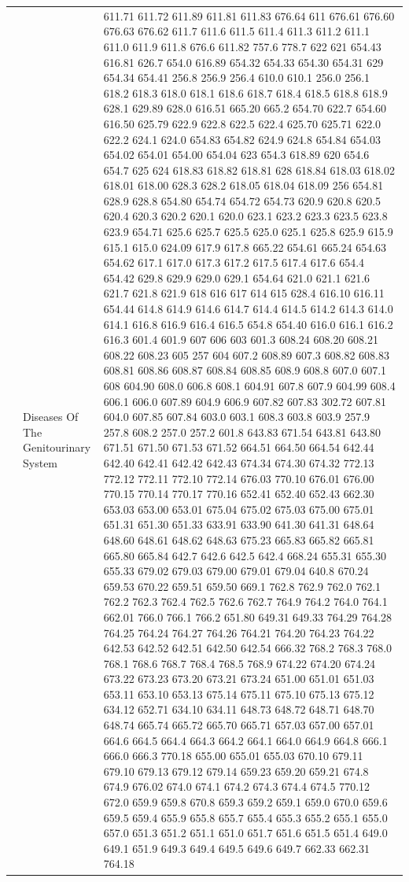 \documentclass[3p,super,numbers,sort&compress,preprint,10pt]{elsarticle}
\begin{document}
\begin{longtable}{|L{.1in}|L{.6in}||L{5.65in}|}
   & Diseases Of The Genitourinary System   &  611.71 611.72 611.89 611.81 611.83 676.64 611 676.61 676.60 676.63 676.62 611.7 611.6 611.5 611.4 611.3 611.2 611.1 611.0 611.9 611.8 676.6 611.82 757.6 778.7 622 621 654.43 616.81 626.7 654.0 616.89 654.32 654.33 654.30 654.31 629 654.34 654.41 256.8 256.9 256.4 610.0 610.1 256.0 256.1 618.2 618.3 618.0 618.1 618.6 618.7 618.4 618.5 618.8 618.9 628.1 629.89 628.0 616.51 665.20 665.2 654.70 622.7 654.60 616.50 625.79 622.9 622.8 622.5 622.4 625.70 625.71 622.0 622.2 624.1 624.0 654.83 654.82 624.9 624.8 654.84 654.03 654.02 654.01 654.00 654.04 623 654.3 618.89 620 654.6 654.7 625 624 618.83 618.82 618.81 628 618.84 618.03 618.02 618.01 618.00 628.3 628.2 618.05 618.04 618.09 256 654.81 628.9 628.8 654.80 654.74 654.72 654.73 620.9 620.8 620.5 620.4 620.3 620.2 620.1 620.0 623.1 623.2 623.3 623.5 623.8 623.9 654.71 625.6 625.7 625.5 625.0 625.1 625.8 625.9 615.9 615.1 615.0 624.09 617.9 617.8 665.22 654.61 665.24 654.63 654.62 617.1 617.0 617.3 617.2 617.5 617.4 617.6 654.4 654.42 629.8 629.9 629.0 629.1 654.64 621.0 621.1 621.6 621.7 621.8 621.9 618 616 617 614 615 628.4 616.10 616.11 654.44 614.8 614.9 614.6 614.7 614.4 614.5 614.2 614.3 614.0 614.1 616.8 616.9 616.4 616.5 654.8 654.40 616.0 616.1 616.2 616.3 601.4 601.9 607 606 603 601.3 608.24 608.20 608.21 608.22 608.23 605 257 604 607.2 608.89 607.3 608.82 608.83 608.81 608.86 608.87 608.84 608.85 608.9 608.8 607.0 607.1 608 604.90 608.0 606.8 608.1 604.91 607.8 607.9 604.99 608.4 606.1 606.0 607.89 604.9 606.9 607.82 607.83 302.72 607.81 604.0 607.85 607.84 603.0 603.1 608.3 603.8 603.9 257.9 257.8 608.2 257.0 257.2 601.8 643.83 671.54 643.81 643.80 671.51 671.50 671.53 671.52 664.51 664.50 664.54 642.44 642.40 642.41 642.42 642.43 674.34 674.30 674.32 772.13 772.12 772.11 772.10 772.14 676.03 770.10 676.01 676.00 770.15 770.14 770.17 770.16 652.41 652.40 652.43 662.30 653.03 653.00 653.01 675.04 675.02 675.03 675.00 675.01 651.31 651.30 651.33 633.91 633.90 641.30 641.31 648.64 648.60 648.61 648.62 648.63 675.23 665.83 665.82 665.81 665.80 665.84 642.7 642.6 642.5 642.4 668.24 655.31 655.30 655.33 679.02 679.03 679.00 679.01 679.04 640.8 670.24 659.53 670.22 659.51 659.50 669.1 762.8 762.9 762.0 762.1 762.2 762.3 762.4 762.5 762.6 762.7 764.9 764.2 764.0 764.1 662.01 766.0 766.1 766.2 651.80 649.31 649.33 764.29 764.28 764.25 764.24 764.27 764.26 764.21 764.20 764.23 764.22 642.53 642.52 642.51 642.50 642.54 666.32 768.2 768.3 768.0 768.1 768.6 768.7 768.4 768.5 768.9 674.22 674.20 674.24 673.22 673.23 673.20 673.21 673.24 651.00 651.01 651.03 653.11 653.10 653.13 675.14 675.11 675.10 675.13 675.12 634.12 652.71 634.10 634.11 648.73 648.72 648.71 648.70 648.74 665.74 665.72 665.70 665.71 657.03 657.00 657.01 664.6 664.5 664.4 664.3 664.2 664.1 664.0 664.9 664.8 666.1 666.0 666.3 770.18 655.00 655.01 655.03 670.10 679.11 679.10 679.13 679.12 679.14 659.23 659.20 659.21 674.8 674.9 676.02 674.0 674.1 674.2 674.3 674.4 674.5 770.12 672.0 659.9 659.8 670.8 659.3 659.2 659.1 659.0 670.0 659.6 659.5 659.4 655.9 655.8 655.7 655.4 655.3 655.2 655.1 655.0 657.0 651.3 651.2 651.1 651.0 651.7 651.6 651.5 651.4 649.0 649.1 651.9 649.3 649.4 649.5 649.6 649.7 662.33 662.31 764.18 
\end{longtable}
\end{document}
